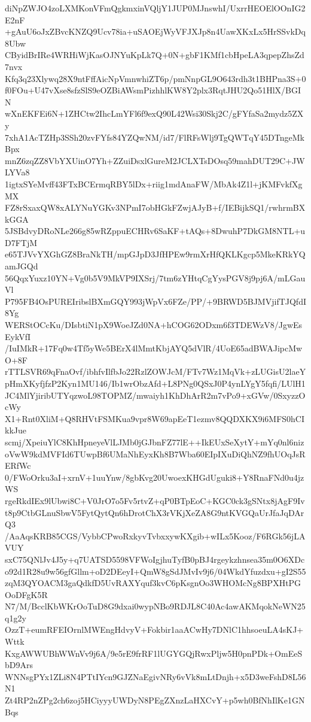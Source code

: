 diNpZWJO4zoLXMKonVFmQgkmxinVQljY1JUP0MJnswhI/UxrrHEOElOOnIG2E2nF
+gAuU6oJxZBvcKNZQ9Ucv78ia+uSAOEjWyVFJXJp8n4UawXKxLx5HrSSvkDq8Ubw
CByidBrIRe4WRHiWjKasOJNYuKpLk7Q+0N+gbF1KMf1cbHpeLA3qpepZhsZd7nvx
Kfq3q23Xlywq28X9ntFffAicNpVmnwhiZT6p/pmNnpGL9O643rdh3t1BHPna3S+0
f0FOu+U47vXse8sfzSlS9eOZBiAWsmPizhhlKW8Y2plx3RqtJHU2Qo51HlX/BGIN
wXnEKFEi6N+1ZHCtw2IhcLmYFl6f9exQ90L42Wsi30Skj2C/gFYfaSa2mydz5ZXy
7xhA1AcTZHp3SSh20zvFYfs84YZQwNM/id7/FlRFsWlj9TgQWTqY45DTngeMkBpx
mnZ6zqZZ8VbYXUinO7Yh+ZZuiDsxlGureM2JCLXTsDOsq59mahDUT29C+JWLYVa8
1igtxSYeMvff43FTxBCErmqRBY5lDx+riig1mdAnaFW/MbAk4Z1l+jKMFvkfXgMX
FZ8rSxaxQW8xALYNuYGKv3NPmI7obHGkFZwjAJyB+f/IEBijkSQ1/rwhrmBXkGGA
5JSBdvyDRoNLe266g85wRZppuECHRv6SaKF+tAQs+8DwuhP7DkGM8NTL+uD7FTjM
e65TJVvYXGhGZ8BraNkTH/mpGJpD3JfHPEw9rmXrHfQKLKgcp5MkeKRkYQamJGQd
56QqxYuxz10YN+Vg0b5V9MkVP9IXSrj/7tm6zYHtqCgYysPGV8j9pj6A/mLGauVl
P795FB4OsPUREIribslBXmGQY993jWpVx6FZe/PP/+9BRWD5BJMVjifTJQfdI8Yg
WERStOCcKu/DIsbtiN1pX9WoeJZd0NA+hCOG62ODxm6f3TDEWzV8/JgwEsEykVfI
/IuIMkR+17Fq0w4Tf5yWe5BErX4lMmtKbjAYQ5dVlR/4UoE65adBWAJipcMwO+8F
rTTLSVR69qFnaOvf/ibhfvIlfbJo22RzlZOWJcM/FTv7Wz1MqVk+zLUGisU2laeY
pHmXKyfjfzP2Kyn1MU146/Ib1wrObzAfd+L8PNg0QSxJ0P4ynLYgY5fqfi/LUlH1
JC4MlYjiribUTYqzwoL98TOPMZ/mwaiyh1KhDhArR2m7vPo9+xGVw/0SxyzzOcWy
X1+Rnt0XliM+Q8RHVtFSMKua9vpr8W69apEeT1ezmv8QQDXKX9i6MFS0hCIkkJue
scmj/XpeiuYlC8KhHpneyeVlLJMb0jGJbnFZ77lE++IkEUxSeXytY+mYq0nl6niz
oVwW9kdMVFId6TUwpBf6UMaNhEyxKh8B7Wba60EIpIXuDiQhNZ9fhUOqJsRERfWc
0/FWoOrku3aI+xrnV+1uuYnw/8gbKvg20UwoexKHGdUguki8+Y8RnaFNd0u4jzWS
rgeRkdIEx9lUbwi8C+V0JrO7o5Fv5rtvZ+qP0BTpEoC+KGC0ck3gSNtx8jAgF9Iv
t8p9CtbGLnuSbwV5FytQytQn6hDrotChX3rVKjXeZA8G9ntKVGQaUrJfaJqDArQ3
/AaAqsKRB85CGS/VybbCPwoRxkyvTvbxxywKXgib+wILx5Kooz/F6RGk56jLAVUY
sxC75QNlJv4J5y+q7UATSD5598VFWoIgjhuTyfB0pBJ4rgeykzhnsea35m0O6XDc
o92d1R28u9w56gfGllm+oD2DEeyI+QmW8gSdJMvIv9j6/04WkdYfuzdxu+gI2S55
zqM3QYOACM3gaQdkfD5UvRAXYquf3kvC6pKsgnOo3WHOMcNg8BPXHtPGOoDFgK5R
N7/M/BcclKbWKrOoTuD8G9dxai0wypNBo9RDJL8C40Ac4awAKMqokNeWN25q1g2y
OzzT+eumRFEIOrnlMWEngHdvyV+Fokbir1aaACwHy7DNlC1hhsoeuLA4sKJ+Wttk
KxgAWWUBhWWnVv9j6A/9e5rE9frRF1lUGYGQjRwxPljw5H0pnPDk+OmEeSbD9Ars
WNNsgPYx1ZLi8N4PTtIYcn9GJZNaEgivNRy6vVk8mLtDnjh+x5D3weFshD8L56N1
Zt4RP2nZPg2ch6zoj5HCiyyyUWDyN8PEgZXnzLaHXCvY+p5wh0BfNhIlKe1GNBqs
